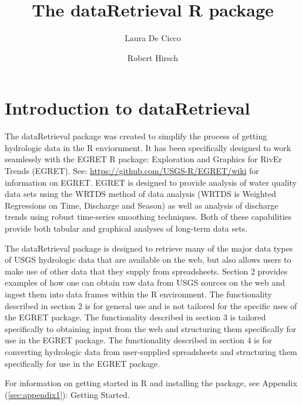 \documentclass[a4paper,11pt]{article}\usepackage[]{graphicx}\usepackage[]{color}
\begin{document}
\title{The dataRetrieval R package}
\author[1]{Laura De Cicco}
\author[1]{Robert Hirsch}






\maketitle
\tableofcontents

\section{Introduction to dataRetrieval}
The dataRetrieval package was created to simplify the process of getting hydrologic data in the R enviornment. It has been specifically designed to work seamlessly with the EGRET R package: Exploration and Graphics for RivEr Trends (EGRET). See: \url{https://github.com/USGS-R/EGRET/wiki} for information on EGRET. EGRET is designed to provide analysis of water quality data sets using the WRTDS method of data analysis (WRTDS is Weighted Regressions on Time, Discharge and Season) as well as analysis of discharge trends using robust time-series smoothing techniques.  Both of these capabilities provide both tabular and graphical analyses of long-term data sets.


The dataRetrieval package is designed to retrieve many of the major data types of USGS hydrologic data that are available on the web, but also allows users to make use of other data that they supply from spreadsheets.  Section 2 provides examples of how one can obtain raw data from USGS sources on the web and ingest them into data frames within the R environment.  The functionality described in section 2 is for general use and is not tailored for the specific uses of the EGRET package.  The functionality described in section 3 is tailored specifically to obtaining input from the web and structuring them specifically for use in the EGRET package.  The functionality described in section 4 is for converting hydrologic data from user-supplied spreadsheets and structuring them specifically for use in the EGRET package.

For information on getting started in R and installing the package, see Appendix (\ref{sec:appendix1}): Getting Started.
\end{document}
